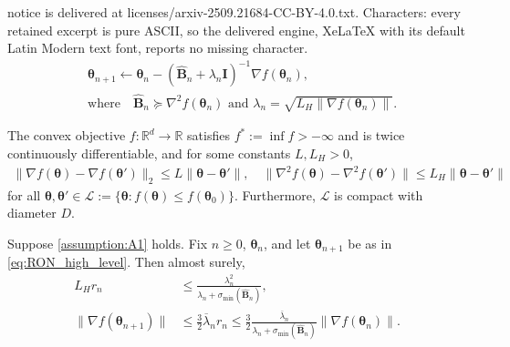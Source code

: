 \documentclass[10pt,a4paper]{amsart}
\def\B{\mathbf{B}}
\def\I{\mathbf{I}}
\def\R{\mathbb{R}}
\newenvironment{customassumption}[1]
{\renewcommand\theinnercustomassumption{#1}\innercustomassumption}
{\endinnercustomassumption}
\def\param{\boldsymbol{\theta}}
\begin{document}
notice is delivered at licenses/arxiv-2509.21684-CC-BY-4.0.txt. Characters: every retained excerpt is pure ASCII, so the delivered engine, XeLaTeX with its default Latin Modern text font, reports no missing character.
\begin{align}\label{eq:RON_high_level}
& \param_{n+1}\xleftarrow[]{}\param_{n} - ( \hat{\B}_{n} + \lambda_{n} \I )^{-1}  \nabla f(\param_{n}),\\
 &\text{where} \quad  \hat{\B}_{n}  \succeq \nabla^{2}f(\param_{n})\text{ and } \lambda_{n}=\sqrt{L_H\| \nabla f(\param_{n})\|}\nonumber.
\end{align}

\begin{customassumption}{A1}[Smooth objective]\label{assumption:A1}
    The convex objective $f:\R^{d}\to \R$  satisfies  $f^{*}:=\inf f>-\infty$ and is twice continuously differentiable, and for some constants $L,L_H>0$, %
    \begin{align}
        \|\nabla f(\param)-\nabla f(\param')\|_2 \leq L\|\param-\param'\|, \quad 
         \|\nabla^2 f(\param)-\nabla^2 f(\param')\| \leq L_H\|\param-\param'\| \label{eq:assump2}
    \end{align}
    for all $\param,\param'\in\mathcal{L}:=\{\param:f(\param)\leq f(\param_0)\}.$ Furthermore, $\mathcal{L}$ is compact with diameter $D$. 
\end{customassumption}

\begin{lemma}[Stability]\label{lem:stability}
	Suppose \ref{assumption:A1} holds. 
	Fix $n\ge 0$, $\param_{n}$, and let $\param_{n+1}$ be as in \eqref{eq:RON_high_level}. Then almost surely,
    \begin{align}
        L_{H}
        r_{n} &\le \frac{ \lambda_{n}^{2}}{\lambda_{n}+\sigma_{\min}(\hat{\B}_{n}) },  
        \label{eq:stability1} \\
        \|\nabla f(\param_{n+1})\| & \leq \frac{3}{2}\overline{\lambda}_n r_{n}\leq  \frac{3}{2}\frac{\overline{\lambda}_n}{\lambda_n+\sigma_{\min}({\hat{\B}_n})}\|\nabla f(\param_n)\|\label{eq:stability2}.
    \end{align}
\end{lemma}
\end{document}
